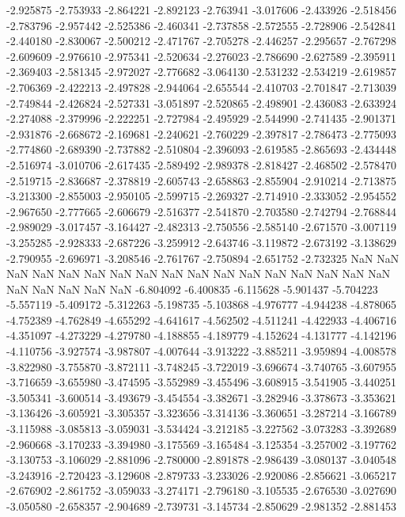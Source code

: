 -2.925875
-2.753933
-2.864221
-2.892123
-2.763941
-3.017606
-2.433926
-2.518456
-2.783796
-2.957442
-2.525386
-2.460341
-2.737858
-2.572555
-2.728906
-2.542841
-2.440180
-2.830067
-2.500212
-2.471767
-2.705278
-2.446257
-2.295657
-2.767298
-2.609609
-2.976610
-2.975341
-2.520634
-2.276023
-2.786690
-2.627589
-2.395911
-2.369403
-2.581345
-2.972027
-2.776682
-3.064130
-2.531232
-2.534219
-2.619857
-2.706369
-2.422213
-2.497828
-2.944064
-2.655544
-2.410703
-2.701847
-2.713039
-2.749844
-2.426824
-2.527331
-3.051897
-2.520865
-2.498901
-2.436083
-2.633924
-2.274088
-2.379996
-2.222251
-2.727984
-2.495929
-2.544990
-2.741435
-2.901371
-2.931876
-2.668672
-2.169681
-2.240621
-2.760229
-2.397817
-2.786473
-2.775093
-2.774860
-2.689390
-2.737882
-2.510804
-2.396093
-2.619585
-2.865693
-2.434448
-2.516974
-3.010706
-2.617435
-2.589492
-2.989378
-2.818427
-2.468502
-2.578470
-2.519715
-2.836687
-2.378819
-2.605743
-2.658863
-2.855904
-2.910214
-2.713875
-3.213300
-2.855003
-2.950105
-2.599715
-2.269327
-2.714910
-2.333052
-2.954552
-2.967650
-2.777665
-2.606679
-2.516377
-2.541870
-2.703580
-2.742794
-2.768844
-2.989029
-3.017457
-3.164427
-2.482313
-2.750556
-2.585140
-2.671570
-3.007119
-3.255285
-2.928333
-2.687226
-3.259912
-2.643746
-3.119872
-2.673192
-3.138629
-2.790955
-2.696971
-3.208546
-2.761767
-2.750894
-2.651752
-2.732325
NaN
NaN
NaN
NaN
NaN
NaN
NaN
NaN
NaN
NaN
NaN
NaN
NaN
NaN
NaN
NaN
NaN
NaN
NaN
NaN
NaN
NaN
-6.804092
-6.400835
-6.115628
-5.901437
-5.704223
-5.557119
-5.409172
-5.312263
-5.198735
-5.103868
-4.976777
-4.944238
-4.878065
-4.752389
-4.762849
-4.655292
-4.641617
-4.562502
-4.511241
-4.422933
-4.406716
-4.351097
-4.273229
-4.279780
-4.188855
-4.189779
-4.152624
-4.131777
-4.142196
-4.110756
-3.927574
-3.987807
-4.007644
-3.913222
-3.885211
-3.959894
-4.008578
-3.822980
-3.755870
-3.872111
-3.748245
-3.722019
-3.696674
-3.740765
-3.607955
-3.716659
-3.655980
-3.474595
-3.552989
-3.455496
-3.608915
-3.541905
-3.440251
-3.505341
-3.600514
-3.493679
-3.454554
-3.382671
-3.282946
-3.378673
-3.353621
-3.136426
-3.605921
-3.305357
-3.323656
-3.314136
-3.360651
-3.287214
-3.166789
-3.115988
-3.085813
-3.059031
-3.534424
-3.212185
-3.227562
-3.073283
-3.392689
-2.960668
-3.170233
-3.394980
-3.175569
-3.165484
-3.125354
-3.257002
-3.197762
-3.130753
-3.106029
-2.881096
-2.780000
-2.891878
-2.986439
-3.080137
-3.040548
-3.243916
-2.720423
-3.129608
-2.879733
-3.233026
-2.920086
-2.856621
-3.065217
-2.676902
-2.861752
-3.059033
-3.274171
-2.796180
-3.105535
-2.676530
-3.027690
-3.050580
-2.658357
-2.904689
-2.739731
-3.145734
-2.850629
-2.981352
-2.881453

